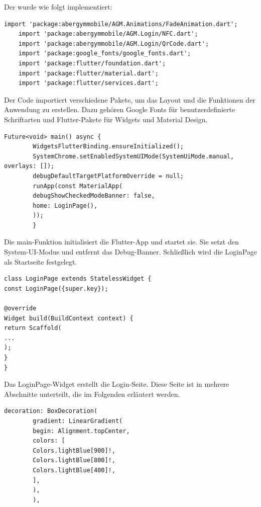 Der wurde wie folgt implementiert:

\begin{lstlisting}[caption=Start-Screen Packages,label=lst:impl:frontend:packages]
    import 'package:abergymmobile/AGM.Animations/FadeAnimation.dart';
    import 'package:abergymmobile/AGM.Login/NFC.dart';
    import 'package:abergymmobile/AGM.Login/QrCode.dart';
    import 'package:google_fonts/google_fonts.dart';
    import 'package:flutter/foundation.dart';
    import 'package:flutter/material.dart';
    import 'package:flutter/services.dart';
\end{lstlisting}

Der Code importiert verschiedene Pakete, um das Layout und die Funktionen der Anwendung zu erstellen. Dazu gehören Google Fonts für benutzerdefinierte Schriftarten und Flutter-Pakete für Widgets und Material Design.

\pagebreak

\begin{lstlisting}[caption= main-Funktion,label=lst:impl:frontend:main]
    Future<void> main() async {
        WidgetsFlutterBinding.ensureInitialized();
        SystemChrome.setEnabledSystemUIMode(SystemUiMode.manual, overlays: []);
        debugDefaultTargetPlatformOverride = null;
        runApp(const MaterialApp(
        debugShowCheckedModeBanner: false,
        home: LoginPage(),
        ));
        }
\end{lstlisting}

Die main-Funktion initialisiert die Flutter-App und startet sie. Sie setzt den System-UI-Modus und entfernt das Debug-Banner. Schließlich wird die LoginPage als Startseite festgelegt.
\newline

\begin{lstlisting}[caption=Login-Seite,label=lst:impl:frontend:login-seite]
    class LoginPage extends StatelessWidget {
const LoginPage({super.key});

@override
Widget build(BuildContext context) {
return Scaffold(
...
);
}
}
\end{lstlisting}

Das LoginPage-Widget erstellt die Login-Seite. Diese Seite ist in mehrere Abschnitte unterteilt, die im Folgenden erläutert werden.
\newline

\begin{lstlisting}[caption=Layout und Hintergrundfarbe,label=lst:impl:frontend:layout]
    decoration: BoxDecoration(
        gradient: LinearGradient(
        begin: Alignment.topCenter,
        colors: [
        Colors.lightBlue[900]!,
        Colors.lightBlue[800]!,
        Colors.lightBlue[400]!,
        ],
        ),
        ),
\end{lstlisting}

